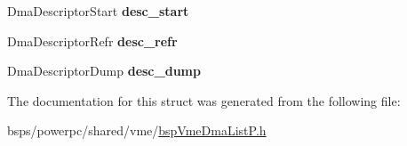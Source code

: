 \begin{DoxyCompactItemize}
\item 
\mbox{\label{structVMEDmaListClassRec___a72c12348ccf91440226a22df66e71b44}} 
Dma\+Descriptor\+Start {\bfseries desc\+\_\+start}
\item 
\mbox{\label{structVMEDmaListClassRec___a433ee93f7314e7074fe44a7ff7f9efd5}} 
Dma\+Descriptor\+Refr {\bfseries desc\+\_\+refr}
\item 
\mbox{\label{structVMEDmaListClassRec___a990c91a26c7d61b8b4c274a42b9988c1}} 
Dma\+Descriptor\+Dump {\bfseries desc\+\_\+dump}
\end{DoxyCompactItemize}


The documentation for this struct was generated from the following file\+:\begin{DoxyCompactItemize}
\item 
bsps/powerpc/shared/vme/\mbox{\hyperlink{bspVmeDmaListP_8h}{bsp\+Vme\+Dma\+List\+P.\+h}}\end{DoxyCompactItemize}
